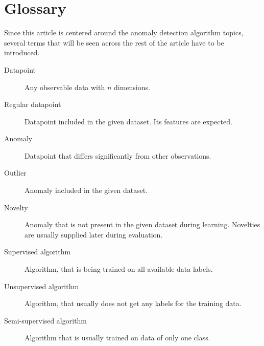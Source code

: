 
\section{Glossary}
\label{sec:theory}
Since this article is centered around the anomaly detection algorithm topics, several terms that will be seen across the rest of the article have to be introduced.
\begin{description}
    \item[Datapoint] Any observable data with \(n\) dimensions.
    \item[Regular datapoint] Datapoint included in the given dataset. Its features are expected.
    \item[Anomaly] Datapoint that differs significantly from other observations.
    \item[Outlier] Anomaly included in the given dataset.
    \item[Novelty] Anomaly that is not present in the given dataset during
learning. Novelties are usually supplied later during evaluation.
    \item[Supervised algorithm] Algorithm, that is being trained on all available data labels.
    \item[Unsupervised algorithm] Algorithm, that usually does not get any labels for the training data.
    \item[Semi-supervised algorithm] Algorithm that is usually trained on data of only one class.
\end{description}